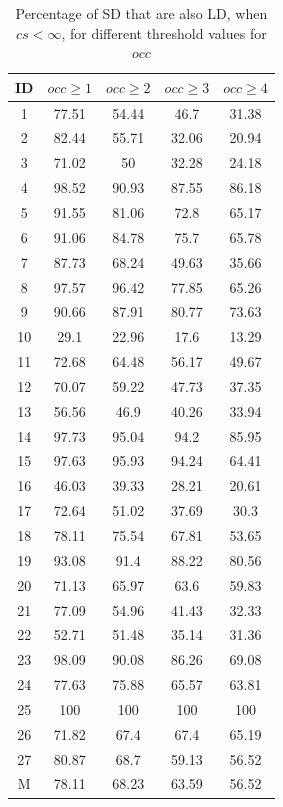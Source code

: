 \documentclass[a4paper,twoside]{article}
\begin{document}
\begin{table}[!h]
\renewcommand{\arraystretch}{1.1}
\caption{Percentage of SD that are also LD,  when  $cs< \infty$, for different threshold values for $occ$ }
\label{table:11}
\centering
\begin{tabular}{|c|c|c|c|c|}
\hline
    ID  & $occ\geq 1$ & $occ\geq 2$ & $occ\geq 3$ & $occ\geq 4$  \\
\hline
1	&	77.51	&	54.44	&	46.7	&	31.38	\\
2	&	82.44	&	55.71	&	32.06	&	20.94	\\
3	&	71.02	&	50	&	32.28	&	24.18	\\
4	&	98.52	&	90.93	&	87.55	&	86.18	\\
5	&	91.55	&	81.06	&	72.8	&	65.17	\\
6	&	91.06	&	84.78	&	75.7	&	65.78	\\
7	&	87.73	&	68.24	&	49.63	&	35.66	\\
8	&	97.57	&	96.42	&	77.85	&	65.26	\\
9	&	90.66	&	87.91	&	80.77	&	73.63	\\
10	&	29.1	&	22.96	&	17.6	&	13.29	\\
11	&	72.68	&	64.48	&	56.17	&	49.67	\\
12	&	70.07	&	59.22	&	47.73	&	37.35	\\
13	&	56.56	&	46.9	&	40.26	&	33.94	\\
14	&	97.73	&	95.04	&	94.2	&	85.95	\\
15	&	97.63	&	95.93	&	94.24	&	64.41	\\
16	&	46.03	&	39.33	&	28.21	&	20.61	\\
17	&	72.64	&	51.02	&	37.69	&	30.3	\\
18	&	78.11	&	75.54	&	67.81	&	53.65	\\
19	&	93.08	&	91.4	&	88.22	&	80.56	\\
20	&	71.13	&	65.97	&	63.6	&	59.83	\\
21	&	77.09	&	54.96	&	41.43	&	32.33	\\
22	&	52.71	&	51.48	&	35.14	&	31.36	\\
23	&	98.09	&	90.08	&	86.26	&	69.08	\\
24	&	77.63	&	75.88	&	65.57	&	63.81	\\
25	&	100	&	100	&	100	&	100	\\
26	&	71.82	&	67.4	&	67.4	&	65.19	\\
27	&	80.87	&	68.7	&	59.13	&	56.52	\\
\hline
M	&	78.11&	68.23	&	63.59	&	56.52	\\
\hline
\end{tabular}
\end{table}
\end{document}
